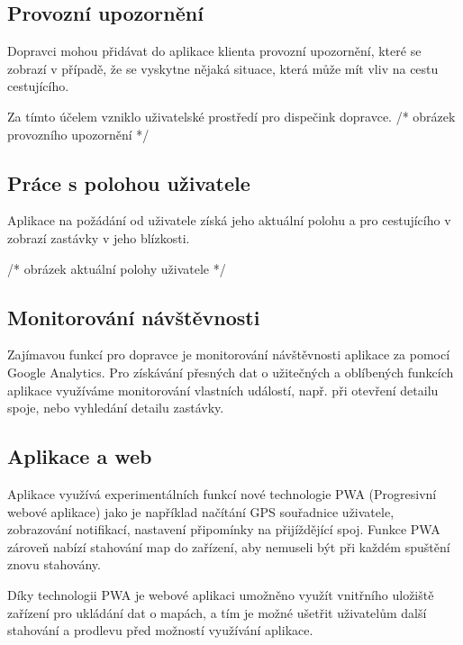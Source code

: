 \subsection{Provozní upozornění}
Dopravci mohou přidávat do aplikace klienta provozní upozornění, které se zobrazí v případě, že se vyskytne nějaká situace, která může mít vliv na cestu cestujícího.\par

Za tímto účelem vzniklo uživatelské prostředí pro dispečink dopravce.
/* obrázek provozního upozornění */
\subsection{Práce s polohou uživatele}
Aplikace na požádání od uživatele získá jeho aktuální polohu a pro cestujícího v zobrazí zastávky v jeho blízkosti.

/* obrázek aktuální polohy uživatele */
\subsection{Monitorování návštěvnosti}
Zajímavou funkcí pro dopravce je monitorování návštěvnosti aplikace za pomocí Google Analytics. Pro získávání přesných dat o užitečných a oblíbených funkcích aplikace využíváme monitorování vlastních událostí, např. při otevření detailu spoje, nebo vyhledání detailu zastávky.
\subsection{Aplikace a web}
Aplikace využívá experimentálních funkcí nové technologie PWA (Progresivní webové aplikace) jako je například načítání GPS souřadnice uživatele, zobrazování notifikací, nastavení připomínky na přijíždějící spoj.
Funkce PWA zároveň nabízí stahování map do zařízení, aby nemuseli být při každém spuštění znovu stahovány.

Díky technologii PWA je webové aplikaci umožněno využít vnitřního uložiště zařízení pro ukládání dat o mapách, a tím je možné ušetřit uživatelům další stahování a prodlevu před možností využívání aplikace.

